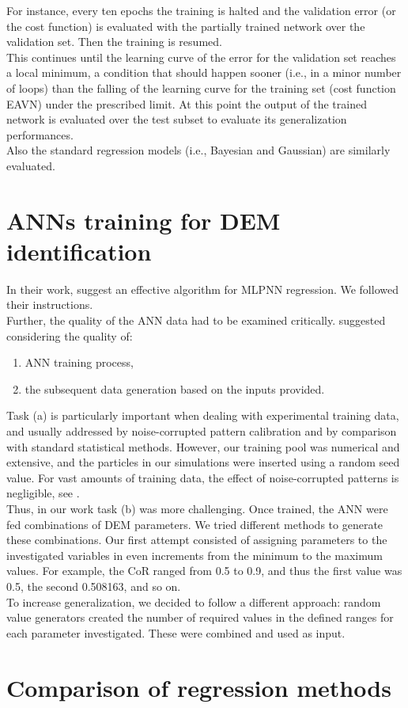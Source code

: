 For instance, every ten epochs the training is halted and the validation error
(or the cost function) is evaluated with the partially trained network over the
validation set.
Then the training is resumed. \\
This continues until the learning curve of the error for the validation set
reaches a local minimum, a condition that should happen sooner (i.e., in a
minor number of loops) than the falling of the learning curve for the training
set (cost function \acs{EAVN}) under the prescribed limit.
At this point the output of the trained network is evaluated over the test
subset to evaluate its generalization performances.\\
Also the standard regression models (i.e., Bayesian and Gaussian) are similarly
evaluated.

\section{ANNs training for DEM identification}
\label{sec:annstrainingfordemidentification}

In their work, \citet{RefWorks:150} suggest an effective algorithm for
\acs{MLPNN} regression. We followed their instructions. \\
Further, the quality of the \acs{ANN} data had to be examined critically. 
\citet{RefWorks:158} 
suggested considering the quality of:
\begin{enumerate}[label=(\alph*)]
  \item {\acs{ANN} training process,}
  \item {the subsequent data generation based on the inputs provided.}
\end{enumerate}

Task (a) is particularly important
when dealing with experimental training data, and
usually addressed
by noise-corrupted pattern calibration
and by comparison with standard statistical methods.
However, our training pool was numerical and extensive, 
and the particles in our simulations were inserted using a random
seed value.
For vast amounts of training data, the effect of noise-corrupted patterns is
negligible, see \citet{RefWorks:158}. \\
Thus, in our work task (b) was more challenging.
Once trained, the \acs{ANN} were fed
combinations of \acs{DEM} parameters. 
We tried different methods to generate these combinations. 
Our first attempt consisted of assigning parameters to the investigated
variables in even increments from the minimum to the maximum values. 
For example, the \acs{CoR} ranged from 0.5 to 0.9, and thus the first value was
0.5, the second 0.508163, and so on. \\
To increase generalization, we decided to follow a different approach: 
random value generators created the number of required values in the defined
ranges for each parameter investigated.
These were combined and used as input.\\

\section{Comparison of regression methods}
\label{sec:comparisonofregressionmethods}


